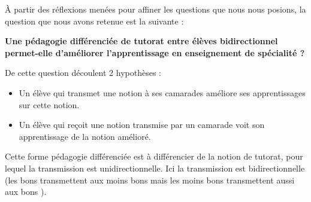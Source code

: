 À partir des réflexions menées pour affiner les questions que nous nous posions, la question que nous avons retenue est la suivante :

\textbf{Une pédagogie différenciée de tutorat entre élèves bidirectionnel permet-elle d'améliorer l'apprentissage en enseignement de spécialité ?}

De cette question découlent 2 hypothèses :
\begin{itemize}
	\item Un élève qui transmet une notion à ses camarades améliore ses apprentissages sur cette notion.
	\item Un élève qui reçoit une notion transmise par un camarade voit son apprentissage de la notion amélioré.
\end{itemize}

Cette forme pédagogie différenciée est à différencier de la notion de tutorat, pour lequel la transmission est unidirectionnelle. Ici la transmission est bidirectionnelle (les \og bons \fg{} transmettent aux \og moins bons \fg{} mais les \og moins bons \fg{} transmettent aussi aux \og bons \fg{}).